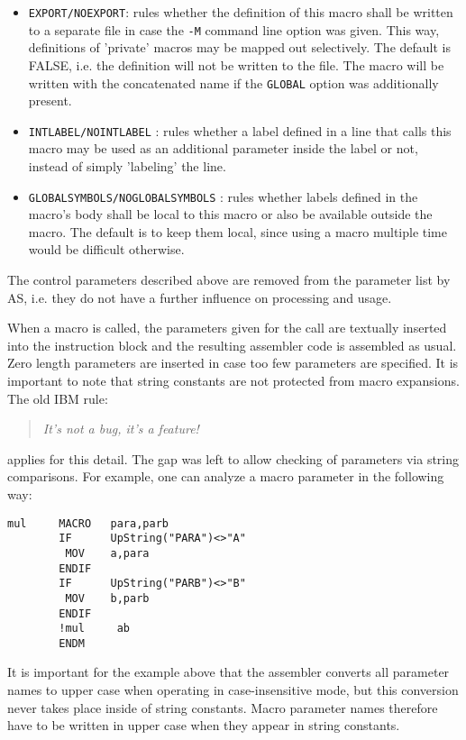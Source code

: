 \documentclass[12pt,twoside]{report}
\newcommand{\tty}[1]{{\tt #1}}
\newcommand{\asname}{{AS}}
\begin{document}
\begin{itemize}
{      and be assigned to section \tty{C}.  This option is turned off by default
      and it only has an effect when it is used from within a section.
      The macro defined locally is not influenced by this option.}
\item{\tty{EXPORT/NOEXPORT}: rules whether the definition of this macro
      shall be written to a separate file in case the \tty{-M} command line
      option was given.  This way, definitions of 'private' macros may
      be mapped out selectively.  The default is FALSE, i.e. the
      definition will not be written to the file.  The macro will be
      written with the concatenated name if the \tty{GLOBAL} option was
      additionally present.}
\item{\tty{INTLABEL/NOINTLABEL} : rules whether a label defined in a line
      that calls this macro may be used as an additional parameter inside
      the label or not, instead of simply 'labeling' the line.}
\item{\tty{GLOBALSYMBOLS/NOGLOBALSYMBOLS} : rules whether labels
      defined in the macro's body shall be local to this macro or
      also be available outside the macro.  The default is to
      keep them local, since using a macro multiple time would be
      difficult otherwise.}
\end{itemize}
The control parameters described above are removed from the parameter
list by \asname{}, i.e. they do not have a further influence on processing
and usage.

When a macro is called, the parameters given for the call are
textually inserted into the instruction block and the resulting
assembler code is assembled as usual.  Zero length parameters are
inserted in case too few parameters are specified.  It is important
to note that string constants are not protected from macro
expansions.  The old IBM rule:
\begin{quote}{\it
 It's not a bug, it's a feature!
}\end{quote}
applies for this detail.  The gap was left to allow checking of
parameters via string comparisons.  For example, one can analyze a
macro parameter in the following way:
\begin{verbatim}
mul     MACRO   para,parb
        IF      UpString("PARA")<>"A"
         MOV    a,para
        ENDIF
        IF      UpString("PARB")<>"B"
         MOV    b,parb
        ENDIF
        !mul     ab
        ENDM
\end{verbatim}
It is important for the example above that the assembler converts all
parameter names to upper case when operating in case-insensitive
mode, but this conversion never takes place inside of string constants.
Macro parameter names therefore have to be written in upper case when
they appear in string constants.
\end{document}
